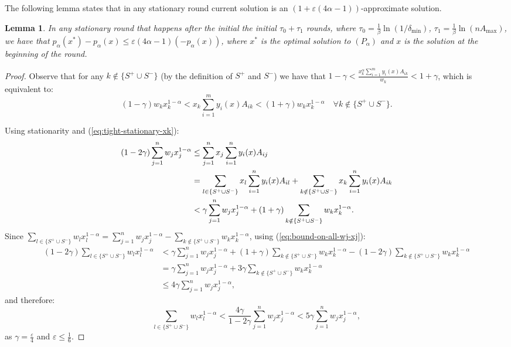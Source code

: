 \documentclass[11pt]{article}
\newtheorem{lemma}[theorem]{Lemma}
\begin{document}
The following lemma states that in any stationary round current solution is an $(1+\varepsilon(4\alpha-1))$-approximate solution.
\begin{lemma}\label{lemma:alpha>1-stationary-near-opt}
In any stationary round that happens after the initial the initial $\tau_0 + \tau_1$ rounds, where $\tau_0 = \frac{1}{\beta}\ln(1/\delta_{\min})$, $\tau_1 = \frac{1}{\beta}\ln(nA_{\max})$, we have that $p_\alpha(x^*) - p_\alpha(x)\leq \varepsilon(4\alpha-1)(-p_\alpha(x))$, where $x^*$ is the optimal solution to $(P_\alpha)$ and $x$ is the solution at the beginning of the round.
\end{lemma}
\begin{proof}
Observe that for any $k\notin \{S^+ \cup S^-\}$ (by the definition of $S^+$ and $S^-$) we have that $1-\gamma<\frac{x_k^{\alpha}\sum_{i=1}^m y_i(x)A_{ik}}{w_k}<1+\gamma$, which is equivalent to:
\begin{equation}
(1-\gamma)w_k x_k^{1-\alpha}< x_k\sum_{i=1}^m y_i(x)A_{ik} < (1+\gamma)w_k x_k^{1-\alpha} \quad \forall k\notin \{S^+\cup S^-\}.\label{eq:tight-stationary-xk}
\end{equation}

Using stationarity and (\ref{eq:tight-stationary-xk}):
\begin{align}
(1-2\gamma)\sum_{j=1}^nw_jx_j^{1-\alpha} &\leq \sum_{j=1}^n x_j\sum_{i=1}^n y_i(x)A_{ij}\notag\\
&= \sum_{l\in\{S^+\cup S^-\}} x_l\sum_{i=1}^n y_i(x)A_{il} +  \sum_{k\notin\{S^+\cup S^-\}} x_k\sum_{i=1}^n y_i(x)A_{ik}\notag\\
&< \gamma \sum_{j=1}^n w_j x_j^{1-\alpha} + (1+\gamma)\sum_{k\notin\{S^+\cup S^-\}} w_k x_k^{1-\alpha}.\label{eq:bound-on-all-wj-xj}
\end{align}
Since $\sum_{l\in\{S^+\cup S^-\}}w_{l}x_l^{1-\alpha} = \sum_{j=1}^n w_j x_j^{1-\alpha} - \sum_{k\notin\{S^+\cup S^-\}} w_k x_k^{1-\alpha}$, using (\ref{eq:bound-on-all-wj-xj}):
\begin{align*}
(1-2\gamma)\sum_{l\in\{S^+\cup S^-\}}w_{l}x_l^{1-\alpha} &< \gamma \sum_{j=1}^n w_j x_j^{1-\alpha} + (1+\gamma)\sum_{k\notin\{S^+\cup S^-\}} w_k x_k^{1-\alpha} - (1-2\gamma)\sum_{k\notin\{S^+\cup S^-\}} w_k x_k^{1-\alpha}\\
&= \gamma \sum_{j=1}^n w_j x_j^{1-\alpha} + 3\gamma \sum_{k\notin\{S^+\cup S^-\}} w_k x_k^{1-\alpha}\\
&\leq 4\gamma \sum_{j=1}^n w_j x_j^{1-\alpha},
\end{align*}
and therefore:
\begin{equation}
\sum_{l\in\{S^+\cup S^-\}}w_{l}x_l^{1-\alpha}<\frac{4\gamma}{1-2\gamma} \sum_{j=1}^n w_j x_j^{1-\alpha} < 5\gamma \sum_{j=1}^n w_j x_j^{1-\alpha}, \label{eq:tight-active-objective-part} 
\end{equation}
as $\gamma = \frac{\varepsilon}{4}$ and $\varepsilon\leq \frac{1}{6}$.


\end{proof}
\end{document}
